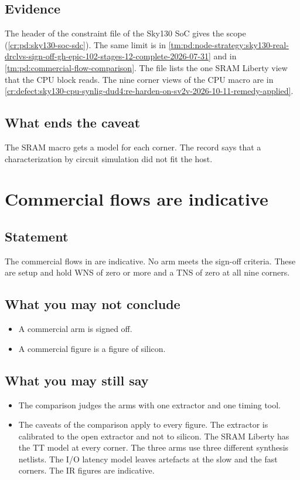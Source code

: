 \subsection*{Evidence}
The header of the constraint file of the Sky130 SoC gives the scope (\cref{cr:pd:sky130-soc-sdc}). The same limit is in \cref{tm:pd:node-strategy:sky130-real-drclvs-sign-off-gh-epic-102-stages-12-complete-2026-07-31} and in \cref{tm:pd:commercial-flow-comparison}. The file  lists the one SRAM Liberty view that the CPU block reads. The nine corner views of the CPU macro are in \cref{cr:defect:sky130-cpu-synlig-dud4:re-harden-on-sv2v-2026-10-11-remedy-applied}.

\subsection*{What ends the caveat}
The SRAM macro gets a model for each corner. The record says that a characterization by circuit simulation did not fit the host.

\section{Commercial flows are indicative}\label{tm:caveat:commercial-flows-indicative}
\subsection*{Statement}
The commercial flows in  are indicative. No arm meets the sign-off criteria. These are setup and hold WNS of zero or more and a TNS of zero at all nine corners.

\subsection*{What you may not conclude}
\begin{itemize}
  \item A commercial arm is signed off.
  \item A commercial figure is a figure of silicon.
\end{itemize}

\subsection*{What you may still say}
\begin{itemize}
  \item The comparison judges the arms with one extractor and one timing tool.
  \item The caveats of the comparison apply to every figure. The extractor is calibrated to the open extractor and not to silicon. The SRAM Liberty has the TT model at every corner. The three arms use three different synthesis netlists. The I/O latency model leaves artefacts at the slow and the fast corners. The IR figures are indicative.
\end{itemize}

